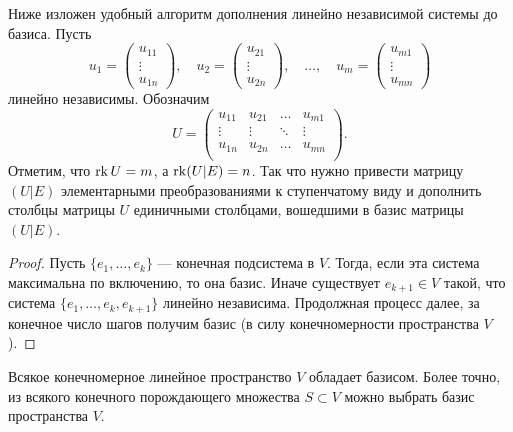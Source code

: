 \begin{remark}
    Ниже изложен удобный алгоритм дополнения линейно независимой системы до базиса. Пусть 
    \[
        u_1 = 
        \begin{pmatrix}
            u_{11}\\
            \vdots\\
            u_{1n}
        \end{pmatrix},\quad
        u_2 = 
        \begin{pmatrix}
            u_{21}\\
            \vdots\\
            u_{2n}
        \end{pmatrix},\quad\ldots,\quad
        u_m = 
        \begin{pmatrix}
            u_{m1}\\
            \vdots\\
            u_{mn}
        \end{pmatrix}
    \] линейно независимы. Обозначим
    \[
        U = 
        \begin{pmatrix}
            u_{11} & u_{21} & \ldots & u_{m1}\\
            \vdots & \vdots & \ddots & \vdots\\
            u_{1n} & u_{2n} & \ldots & u_{mn}\\
        \end{pmatrix}.
    \]
    Отметим, что $\operatorname{rk} U = m$, а $\operatorname{rk}(U \vert E) = n$. Так что нужно привести матрицу $(U \vert E)$ элементарными преобразованиями к ступенчатому виду и дополнить столбцы матрицы $U$ единичными столбцами, вошедшими в базис матрицы $(U \vert E)$.
\end{remark}

\begin{proof}
    Пусть $\{e_1, \ldots, e_k\}$ --- конечная подсистема в $V$. Тогда, если эта система максимальна по включению, то она базис. Иначе существует $e_{k + 1} \in V$ такой, что система $\{e_1, \ldots, e_k, e_{k + 1}\}$ линейно независима. Продолжная процесс далее, за конечное число шагов получим базис (в силу конечномерности пространства $V$).
\end{proof}

\begin{lemma}
    Всякое конечномерное линейное пространство $V$ обладает базисом. Более точно, из всякого конечного порождающего множества $S \subset V$ можно выбрать базис пространства $V$.
\end{lemma}


